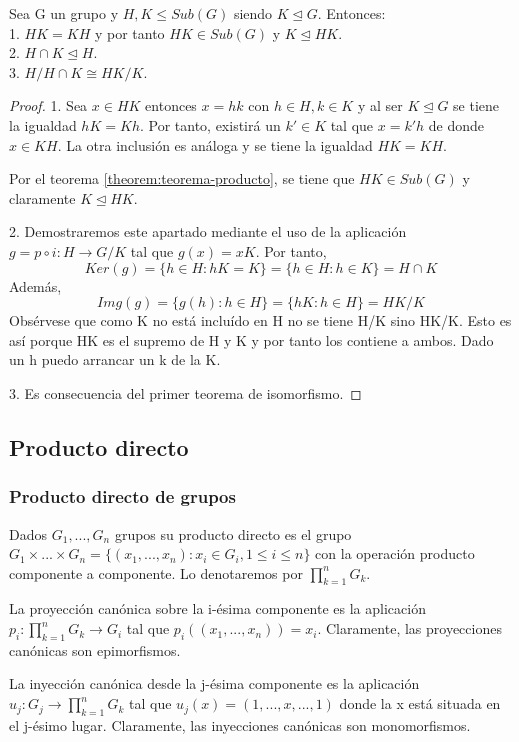 \begin{theorem}
Sea G un grupo y $H,K \le Sub(G)$ siendo $K \trianglelefteq G$. Entonces:\\
1. $HK = KH$ y por tanto $HK \in Sub(G)$ y $K \trianglelefteq HK$.\\
2. $H \cap K \trianglelefteq H$.\\
3. $H/H \cap K \cong HK/K$.
\end{theorem}
\begin{proof}
1. Sea $x \in HK$ entonces $x = hk$ con $h \in H, k \in K$ y al ser $K \trianglelefteq G$ se tiene la igualdad $hK = Kh$. Por tanto, existirá un $k' \in K$ tal que $x = k'h$ de donde $x \in KH$. La otra inclusión es análoga y se tiene la igualdad $HK = KH$.

Por el teorema \ref{theorem:teorema-producto}, se tiene que $HK \in Sub(G)$ y claramente $K \trianglelefteq HK$. 

2. Demostraremos este apartado mediante el uso de la aplicación $g=p \circ i: H \rightarrow G/K$ tal que $g(x) = xK$. Por tanto, $$Ker(g) = \{h \in H:hK = K\} = \{h \in H: h \in K\} = H \cap K$$ Además, $$Img(g) = \{g(h):h \in H\} = \{hK: h \in H\} = HK/K$$ Obsérvese que como K no está incluído en H no se tiene H/K sino HK/K. Esto es así porque HK es el supremo de H y K y por tanto los contiene a ambos. Dado un h puedo arrancar un k de la K.
 
3. Es consecuencia del primer teorema de isomorfismo.
\end{proof}

\subsection{Producto directo}

\subsubsection{Producto directo de grupos}

\begin{definition}
Dados $G_1,...,G_n$ grupos su producto directo es el grupo $G_1 \times ... \times G_n = \{(x_1,...,x_n):x_i \in G_i,1 \le i \le n\}$ con la operación producto componente a componente. Lo denotaremos por $\prod_{k=1}^{n} G_k$.
\end{definition}

\begin{definition}
La proyección canónica sobre la i-ésima componente es la aplicación $p_i:\prod_{k=1}^{n} G_k \rightarrow G_i$ tal que $p_i((x_1,...,x_n)) = x_i$. Claramente, las proyecciones canónicas son epimorfismos.

La inyección canónica desde la j-ésima componente es la aplicación $u_j:G_j \rightarrow \prod_{k=1}^{n} G_k$ tal que $u_j(x) = (1,...,x,...,1)$ donde la x está situada en el j-ésimo lugar. Claramente, las inyecciones canónicas son monomorfismos.
\end{definition}

